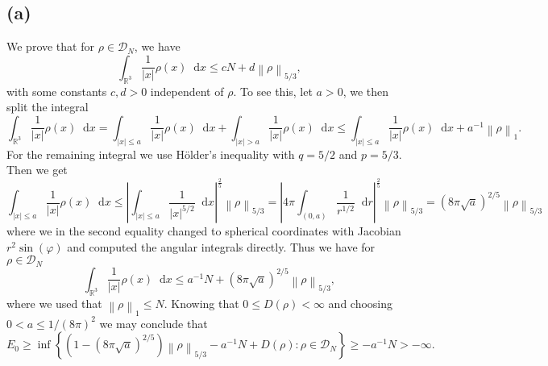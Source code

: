 \documentclass[a4paper,11pt]{article}
\newcommand{\norm}[1]{\left\lVert #1 \right\rVert}
\newcommand{\abs}[1]{\left\lvert #1 \right\rvert}
\newcommand*\diff{\mathop{}\!\mathrm{d}}
\newcommand{\R}{\mathbb{R}}
\numberwithin{equation}{section}
\begin{document}
\subsection*{(a)}
We prove that for $ \rho\in \mathcal{D}_N $, we have\begin{equation}
\int_{\R^3}\frac{1}{\abs{x}}\rho(x)\diff x\leq cN+d\norm{\rho}_{5/3},
\end{equation}
with some constants $ c,d>0 $ independent of $ \rho $. To see this, let $a>0$, we then split the integral \begin{equation}
\int_{\R^3}\frac{1}{\abs{x}}\rho(x)\diff x=\int_{\abs{x}\leq a}\frac{1}{\abs{x}}\rho(x)\diff x+\int_{\abs{x}>a}\frac{1}{\abs{x}}\rho(x)\diff x\leq\int_{\abs{x}\leq a}\frac{1}{\abs{x}}\rho(x)\diff x+a^{-1}\norm{\rho}_1.
\end{equation}
For the remaining integral we use H\"older's inequality with $ q=5/2 $  and $ p=5/3 $. Then we get \begin{equation}
\int_{\abs{x}\leq a}\frac{1}{\abs{x}}\rho(x)\diff x\leq\abs{\int_{\abs{x}\leq a}\frac{1}{\abs{x}^{5/2}}\diff x}^{\frac{2}{5}}\norm{\rho}_{5/3}=\abs{4\pi \int_{(0,a)}\frac{1}{r^{1/2}}\diff r}^{\frac{2}{5}}\norm{\rho}_{5/3}=(8\pi\sqrt{a})^{2/5}\norm{\rho}_{5/3}
\end{equation}
where we in the second equality changed to spherical coordinates with Jacobian $ r^2\sin(\varphi) $ and computed the angular integrals directly. Thus we have for $ \rho\in \mathcal{D}_N $ \begin{equation}
\int_{\R^3}\frac{1}{\abs{x}}\rho(x)\diff x\leq a^{-1}N+(8\pi\sqrt{a})^{2/5}\norm{\rho}_{5/3},
\end{equation}
where we used that $ \norm{\rho}_1\leq N $.
Knowing that $ 0\leq D(\rho)<\infty $ and choosing $ 0<a\leq 1/(8\pi)^2 $ we may conclude that \begin{equation}
E_0\geq\inf\left\{(1-(8\pi\sqrt{a})^{2/5})\norm{\rho}_{5/3}-a^{-1}N+D(\rho) : \rho\in\mathcal{D}_N\right\}\geq-a^{-1}N>-\infty.
\end{equation}
\end{document}
